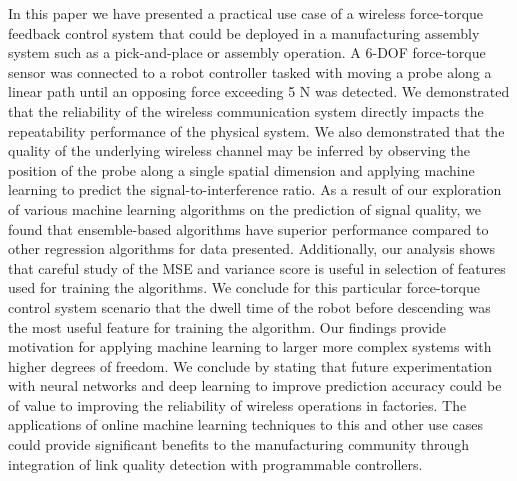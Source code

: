 	In this paper we have presented a practical use case of a wireless force-torque feedback control system that could be deployed in a manufacturing assembly system such as a pick-and-place or assembly operation.  A 6-DOF force-torque sensor was connected to a robot controller tasked with moving a probe along a linear path until an opposing force exceeding 5 N was detected.  We demonstrated that the reliability of the wireless communication system directly impacts the repeatability performance of the physical system. We also demonstrated that the quality of the underlying wireless channel may be inferred by observing the position of the probe along a single spatial dimension and applying machine learning to predict the signal-to-interference ratio. As a result of our exploration of various machine learning algorithms on the prediction of signal quality, we found that ensemble-based algorithms have superior performance compared to other regression algorithms for data presented.  Additionally, our analysis shows that careful study of the MSE and variance score is useful in selection of features used for training the algorithms. We conclude for this particular force-torque control system scenario that the dwell time of the robot before descending was the most useful feature for training the algorithm. Our findings provide motivation for applying machine learning to larger more complex systems with higher degrees of freedom. We conclude by stating that future  experimentation with neural networks and deep learning to improve prediction accuracy could be of value to improving the reliability of wireless operations in factories. The applications of online machine learning techniques to this and other use cases could provide significant benefits to the manufacturing community through integration of link quality detection with programmable controllers.
	


